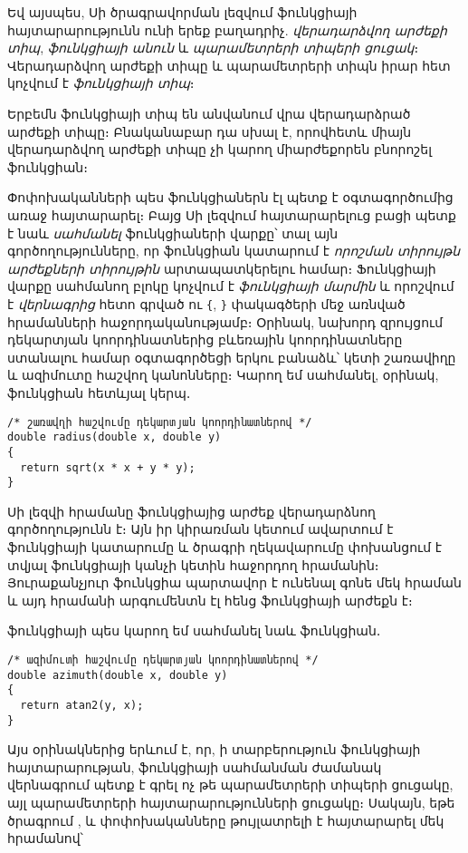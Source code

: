 Եվ այսպես, Սի ծրագրավորման լեզվում ֆունկցիայի հայտարարությունն ունի
երեք բաղադրիչ. \emph{վերադարձվող արժեքի տիպ}, \emph{ֆունկցիայի անուն}
և \emph{պարամետրերի տիպերի ցուցակ}։ Վերադարձվող արժեքի տիպը և
պարամետրերի տիպն իրար հետ կոչվում է \emph{ֆունկցիայի տիպ}։


Երբեմն ֆունկցիայի տիպ են անվանում վրա վերադարձրած արժեքի տիպը։
Բնականաբար դա սխալ է, որովհետև միայն վերադարձվող արժեքի տիպը չի
կարող միարժեքորեն բնորոշել ֆունկցիան։

Փոփոխականների պես ֆունկցիաներն էլ պետք է օգտագործումից առաջ հայտարարել։
Բայց Սի լեզվում հայտարարելուց բացի պետք է նաև \emph{սահմանել}
 ֆունկցիաների վարքը՝ տալ այն գործողությունները,
որ ֆունկցիան կատարում է \emph{որոշման տիրույթն} \emph{արժեքների տիրույթին}
արտապատկերելու համար։ Ֆունկցիայի վարքը սահմանող բլոկը կոչվում է
\emph{ֆունկցիայի մարմին} և որոշվում է
\emph{վերնագրից} հետո գրված ու \verb|{|, \verb|}| փակագծերի մեջ առնված
հրամանների հաջորդականությամբ։ Օրինակ, նախորդ զրույցում դեկարտյան
կոորդինատներից բևեռային կոորդինատները ստանալու համար օգտագործեցի երկու
բանաձև՝ կետի շառավիղը և ազիմուտը հաշվող կանոնները։ Կարող եմ սահմանել,
օրինակ,  ֆունկցիան հետևյալ կերպ․

\begin{Verbatim}
/* շառավղի հաշվումը դեկարտյան կոորդինատներով */
double radius(double x, double y)
{
  return sqrt(x * x + y * y);
}
\end{Verbatim}

Սի լեզվի  հրամանը ֆունկցիայից արժեք
վերադարձնող գործողությունն է։ Այն իր կիրառման կետում ավարտում է
ֆունկցիայի կատարումը և ծրագրի ղեկավարումը փոխանցում է տվյալ ֆունկցիայի
կանչի կետին հաջորդող հրամանին։ Յուրաքանչյուր ֆունկցիա պարտավոր է ունենալ
գոնե մեկ  հրաման և այդ հրամանի արգումենտն էլ հենց
ֆունկցիայի արժեքն է։

 ֆունկցիայի պես կարող եմ սահմանել նաև 
ֆունկցիան․

\begin{Verbatim}
/* ազիմուտի հաշվումը դեկարտյան կոորդինատներով */
double azimuth(double x, double y)
{
  return atan2(y, x);
}
\end{Verbatim}

Այս օրինակներից երևում է, որ, ի տարբերություն ֆունկցիայի հայտարարության,
ֆունկցիայի սահմանման ժամանակ վերնագրում պետք է գրել ոչ թե պարամետրերի տիպերի
ցուցակը, այլ պարամետրերի հայտարարությունների ցուցակը։ Սակայն, եթե ծրագրում
,  և  փոփոխականները թույլատրելի է հայտարարել
մեկ հրամանով՝


